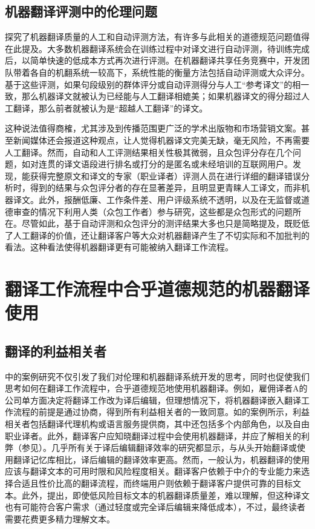 \documentclass[output=paper]{langscibook}
\begin{document}
\subsection{机器翻译评测中的伦理问题}

 探究了机器翻译质量的人工和自动评测方法，有许多与此相关的道德规范问题值得在此提及。大多数机器翻译系统会在训练过程中对译文进行自动评测，待训练完成后，以简单快速的低成本方式再次进行评测。在机器翻译共享任务竞赛中，开发团队带着各自的机翻系统一较高下，系统性能的衡量方法包括自动评测或大众评分。基于这些评测，如果句段级别的群体评分或自动评测得分与人工“参考译文”的相一致，那么机器译文就被认为已经能与人工翻译相媲美；如果机器译文的得分超过人工翻译，那么前者就被认为是“超越人工翻译”的译文。

这种说法值得商榷，尤其涉及到传播范围更广泛的学术出版物和市场营销文案。甚至新闻媒体还会报道这种观点，让人觉得机器译文完美无缺，毫无风险，不再需要人工翻译。然而，自动和人工评测结果相关性极其微弱，且众包评分存在几个问题，如对连贯的译文语段进行排名或打分的是匿名或未经培训的互联网用户。\citet{FreitagMacherey2021}发现，能获得完整原文和译文的专家（职业译者）评测人员在进行详细的翻译错误分析时，得到的结果与众包评分者的存在显著差异，且明显更青睐人工译文，而非机器译文。此外，报酬低廉、工作条件差、用户评级系统不透明，以及在无监督或道德审查的情况下利用人类（众包工作者）参与研究，这些都是众包形式的问题所在。尽管如此，基于自动评测和众包评分的测评结果大多也只是简略提及，既贬低了人工翻译的价值，还让翻译客户等大众对机器翻译产生了不切实际和不加批判的看法。这种看法使得机器翻译更有可能被纳入翻译工作流程。


\section{翻译工作流程中合乎道德规范的机器翻译使用}\label{sec:moorkens:3}
\subsection{翻译的利益相关者}\label{sec:moorkens:3.1}

中的案例研究不仅引发了我们对伦理和机器翻译系统开发的思考，同时也促使我们思考如何在翻译工作流程中，合乎道德规范地使用机器翻译。例如，雇佣译者A的公司单方面决定将翻译工作改为译后编辑，但理想情况下，将机器翻译嵌入翻译工作流程的前提是通过协商，得到所有利益相关者的一致同意。如的案例所示，利益相关者包括翻译代理机构或语言服务提供商，其中还包括多个内部角色，以及自由职业译者。此外，翻译客户应知晓翻译过程中会使用机器翻译，并应了解相关的利弊（参见）。几乎所有关于译后编辑翻译效率的研究都显示，与从头开始翻译或使用翻译记忆库相比，译后编辑的翻译效率更高。然而，一般认为，机器翻译的使用应该与翻译文本的可用时限和风险程度相关。翻译客户依赖于中介的专业能力来选择合适且性价比高的翻译流程，而终端用户则依赖于翻译客户提供可靠的目标文本。此外，\citet{Pym2012}提出，即使低风险目标文本的机器翻译质量差，难以理解，但这种译文也有可能符合客户需求（通过轻度或完全译后编辑来降低成本），不过，最终读者需要花费更多精力理解文本。
\end{document}
